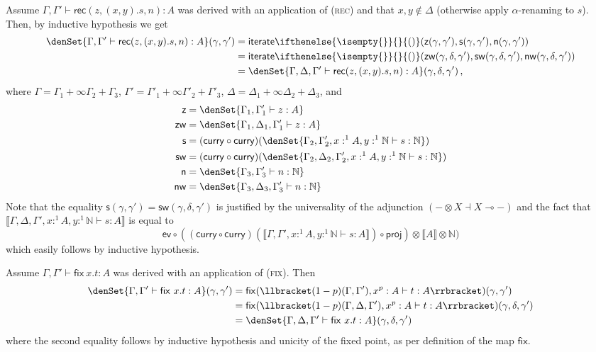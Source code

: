 \documentclass[a4paper,UKenglish,cleveref, autoref, thm-restate]{lipics-v2021}
\providecommand*{\ifempty}[3]{\ifthenelse{\isempty{#1}}{#2}{#3}}
\newcommand{\parensmathoper}[2]{\ensuremath{#1\ifempty{#2}{}{(#2)}}}
\newcommand{\lol}{\mathbin{\multimap}}
\newcommand{\mprod}{\otimes}
\newcommand{\mexp}{\lol}
\newcommand{\nat}{\mathbb{N}}
\newcommand{\semfix}{\mathsf{fix}}
\newcommand{\iterate}[1][n]{\parensmathoper{\mathsf{iterate}}{#1}}
\newcommand{\proj}{\mathsf{proj}}
\newcommand{\ts}{\vdash}
\newcommand{\hastype}[3]{#1\ts #2 : #3}
\newcommand{\fix}[2]{\mathsf{fix~} #1 . #2 }
\newcommand{\Rec}[3]{\mathsf{rec}(#1,#2,#3)}
\newcommand{\curry}{\mathsf{curry}}
\newcommand{\eval}{\mathsf{ev}}
\newcommand{\den}[1]{\llbracket #1\rrbracket}
\begin{document}
\begin{description}[font=\sc,wide]
\item[Case (rec):] Assume $\hastype{\Gamma,\Gamma'}{ \Rec{z}{(x,y).s}{n} }{A}$ was derived with an application of (\textsc{rec}) and that $x,y \notin \Delta$ (otherwise apply $\alpha$-renaming to $s$).
Then, by inductive hypothesis we get
\begin{align*}
\denSet{\hastype{\Gamma,\Gamma'}{\Rec{z}{(x,y).s}{n}}{A}}(\gamma,\gamma')
&= \iterate[](\mathsf{z}(\gamma,\gamma'),\mathsf{s}(\gamma,\gamma'),\mathsf{n}(\gamma,\gamma')) \\
&= \iterate[](\mathsf{zw}(\gamma,\delta,\gamma'),\mathsf{sw}(\gamma,\delta,\gamma'),\mathsf{nw}(\gamma,\delta,\gamma')) \\
&= \denSet{\hastype{\Gamma,\Delta,\Gamma'}{\Rec{z}{(x,y).s}{n}}{A}}(\gamma,\delta,\gamma') \,,
\end{align*}
where $\Gamma = \Gamma_1+\infty\Gamma_2+\Gamma_3$, 
$\Gamma' = \Gamma'_1+\infty\Gamma'_2+\Gamma'_3$, $\Delta=\Delta_1+\infty\Delta_2+\Delta_3$, and 
\begin{align*}
\mathsf{z} &= \denSet{\hastype{\Gamma_1,\Gamma'_1}{z}{A}} \\
\mathsf{zw} &= \denSet{\hastype{\Gamma_1,\Delta_1,\Gamma'_1}{z}{A}} \\
\mathsf{s} &= (\curry\circ\curry)(\denSet{\hastype{\Gamma_2,\Gamma'_2,x:^1A,y:^1\nat}{s}{\nat}}) \\
\mathsf{sw} &= (\curry\circ\curry)(\denSet{\hastype{\Gamma_2,\Delta_2,\Gamma'_2,x:^1A,y:^1\nat}{s}{\nat}}) \\
\mathsf{n} &= \denSet{\hastype{\Gamma_3,\Gamma'_3}{n}{\nat}} \\
\mathsf{nw} &= \denSet{\hastype{\Gamma_3,\Delta_3,\Gamma'_3}{n}{\nat}}
\end{align*}
Note that the equality $\mathsf{s}(\gamma,\gamma') = \mathsf{sw}(\gamma,\delta,\gamma')$ is justified by the universality of the
adjunction $(- \mprod X \dashv X \mexp -)$ and the fact that
$\den{\hastype{\Gamma,\Delta,\Gamma',x:^1A,y:^1\nat}{s}{A}}$ is equal
to 
\begin{equation*}
\eval \circ ((\curry\circ\curry)(\den{\hastype{\Gamma,\Gamma',x:^1A,y:^1\nat}{s}{A}}) \circ \proj) \mprod \den A \mprod \nat)
\end{equation*}
which easily follows by inductive hypothesis.

\item[Case (fix):] Assume $\hastype{\Gamma,\Gamma'}{\fix{x}{t}}{A}$ was derived with an application of (\textsc{fix}). Then
\begin{align*}
\denSet{\hastype{\Gamma,\Gamma'}{\fix{x}{t}}{A}}(\gamma,\gamma')
&=\semfix(\den{\hastype{(1-p)(\Gamma,\Gamma'),x^p:A}{t}{A}})(\gamma,\gamma') \\
&=\semfix(\den{\hastype{(1-p)(\Gamma,\Delta,\Gamma'),x^p:A}{t} {A}})(\gamma,\delta,\gamma') \\
&= \denSet{\hastype{\Gamma,\Delta,\Gamma'}{\fix{x}{t}}{A}}(\gamma,\delta,\gamma')
\end{align*}
where the second equality follows by inductive hypothesis and unicity of the fixed point, as per definition of the map $\semfix$.
\end{description}
\end{document}
